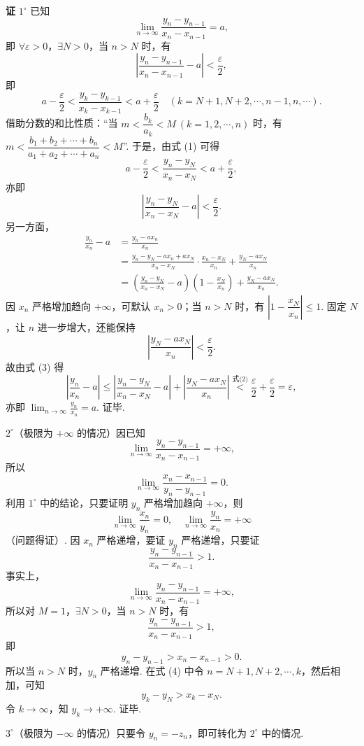 \documentclass[UTF8,12pt,a4paper,fontset=fandol]{ctexart}
\begin{document}
\noindent\textbf{证}\quad
$1^\circ$ 已知
\[
  \lim_{n\to\infty}\frac{y_n-y_{n-1}}{x_n-x_{n-1}}=a,
\]
即 $\forall\varepsilon>0$，$\exists N>0$，当 $n>N$ 时，有
\[
  \left|\frac{y_n-y_{n-1}}{x_n-x_{n-1}}-a\right|<\frac\varepsilon2,
\]
即
\[
  a-\frac\varepsilon2
  <\frac{y_k-y_{k-1}}{x_k-x_{k-1}}
  <a+\frac\varepsilon2
  \quad(k=N+1,N+2,\cdots,n-1,n,\cdots). \tag{1}
\]
借助分数的和比性质：“当
$m<\dfrac{b_k}{a_k}<M\ (k=1,2,\cdots,n)$ 时，有
$m<\dfrac{b_1+b_2+\cdots+b_n}{a_1+a_2+\cdots+a_n}<M$”.
于是，由式 (1) 可得
\[
  a-\frac\varepsilon2
  <\frac{y_n-y_N}{x_n-x_N}
  <a+\frac\varepsilon2,
\]
亦即
\[
  \left|\frac{y_n-y_N}{x_n-x_N}-a\right|<\frac\varepsilon2. \tag{2}
\]
另一方面，
\[
\begin{aligned}
  \frac{y_n}{x_n}-a
  &=\frac{y_n-ax_n}{x_n}\\
  &=\frac{y_n-y_N-ax_n+ax_N}{x_n-x_N}\cdot
  \frac{x_n-x_N}{x_n}+\frac{y_N-ax_N}{x_n}\\
  &=\left(\frac{y_n-y_N}{x_n-x_N}-a\right)
  \left(1-\frac{x_N}{x_n}\right)+\frac{y_N-ax_N}{x_n}.
\end{aligned} \tag{3}
\]
因 $x_n$ 严格增加趋向 $+\infty$，可默认 $x_n>0$；当 $n>N$ 时，有
$\left|1-\dfrac{x_N}{x_n}\right|\le1$. 固定 $N$，让 $n$ 进一步增大，还能保持
\[
  \left|\frac{y_N-ax_N}{x_n}\right|<\frac\varepsilon2.
\]
故由式 (3) 得
\[
  \left|\frac{y_n}{x_n}-a\right|
  \le
  \left|\frac{y_n-y_N}{x_n-x_N}-a\right|
  +\left|\frac{y_N-ax_N}{x_n}\right|
  \stackrel{\text{式(2)}}{<}
  \frac\varepsilon2+\frac\varepsilon2=\varepsilon,
\]
亦即 $\displaystyle\lim_{n\to\infty}\frac{y_n}{x_n}=a$. 证毕.

$2^\circ$（极限为 $+\infty$ 的情况）因已知
\[
  \lim_{n\to\infty}\frac{y_n-y_{n-1}}{x_n-x_{n-1}}=+\infty,
\]
所以
\[
  \lim_{n\to\infty}\frac{x_n-x_{n-1}}{y_n-y_{n-1}}=0.
\]
利用 $1^\circ$ 中的结论，只要证明 $y_n$ 严格增加趋向 $+\infty$，则
\[
  \lim_{n\to\infty}\frac{x_n}{y_n}=0,\quad
  \lim_{n\to\infty}\frac{y_n}{x_n}=+\infty
\]
（问题得证）. 因 $x_n$ 严格递增，要证 $y_n$ 严格递增，只要证
\[
  \frac{y_n-y_{n-1}}{x_n-x_{n-1}}>1.
\]
事实上，
\[
  \lim_{n\to\infty}\frac{y_n-y_{n-1}}{x_n-x_{n-1}}=+\infty,
\]
所以对 $M=1$，$\exists N>0$，当 $n>N$ 时，有
\[
  \frac{y_n-y_{n-1}}{x_n-x_{n-1}}>1,
\]
即
\[
  y_n-y_{n-1}>x_n-x_{n-1}>0. \tag{4}
\]
所以当 $n>N$ 时，$y_n$ 严格递增. 在式 (4) 中令 $n=N+1,N+2,\cdots,k$，然后相加，可知
\[
  y_k-y_N>x_k-x_N.
\]
令 $k\to\infty$，知 $y_k\to+\infty$. 证毕.

$3^\circ$（极限为 $-\infty$ 的情况）只要令 $y_n=-z_n$，即可转化为 $2^\circ$ 中的情况.
\end{document}
